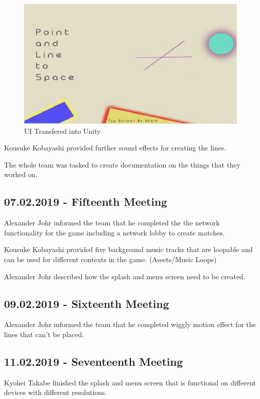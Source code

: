 \begin{figure}[htbp]
	\centering
		\includegraphics[width=1.00\textwidth]{img/UiInUnity1.png}
	\caption[UI Transfered into Unity]{UI Transfered into Unity}
	\label{fig:UiInUnity1}
\end{figure}

Kousuke Kobayashi provided further sound effects for creating the lines.

The whole team was tasked to create documentation on the things that they worked on.


\subsection{07.02.2019  - Fifteenth Meeting}
Alexander Johr informed the team that he completed the the network functionality for the game including a network lobby to create matches.

Kousuke Kobayashi provided five background music tracks that are loopable and can be used for different contexts in the game. (Assets/Music Loops)

Alexander Johr described how the splash and menu screen need to be created.

\subsection{09.02.2019  - Sixteenth Meeting}
Alexander Johr informed the team that he completed wiggly motion effect for the lines that can’t be placed.


\subsection{11.02.2019  - Seventeenth Meeting}
Kyohei Takabe finished the splash and menu screen that is functional on different devices with different resolutions.

